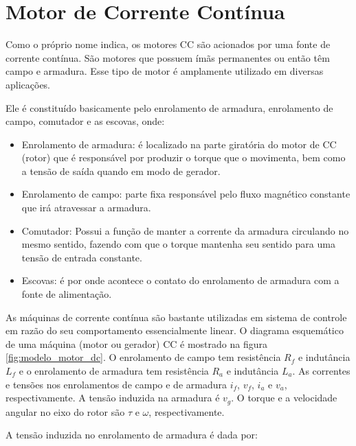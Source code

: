 \section{Motor de Corrente Contínua}
\label{sec:motor_ref_teo}
Como o próprio nome indica, os motores CC são acionados por uma fonte de corrente contínua. São motores que possuem ímãs permanentes ou então têm campo e armadura. Esse tipo de motor é amplamente utilizado em diversas aplicações.

Ele é constituído basicamente pelo enrolamento de armadura, enrolamento de campo, comutador e as escovas, onde:

\begin{itemize}
    \item Enrolamento de armadura: é localizado na parte giratória do motor de CC (rotor) que é responsável por produzir o torque que o movimenta, bem como a tensão de saída quando em modo de gerador.
    
    \item Enrolamento de campo: parte fixa responsável pelo fluxo magnético constante que irá atravessar a armadura. 
    
    \item Comutador: Possui a função de manter a corrente da armadura circulando no mesmo sentido, fazendo com que o torque mantenha seu sentido para uma tensão de entrada constante.
    
    \item Escovas: é por onde acontece o contato do enrolamento de armadura com a fonte de alimentação.
\end{itemize}


As máquinas de corrente contínua são bastante utilizadas em sistema de controle em razão do seu comportamento essencialmente linear. O diagrama esquemático de uma máquina (motor ou gerador) CC é mostrado na figura \ref{fig:modelo_motor_dc}. O enrolamento de campo tem resistência $R_f$ e indutância $L_f$ e o enrolamento de armadura tem resistência $R_a$ e indutância $L_a$. As correntes e tensões nos enrolamentos de campo e de armadura $i_f$, $v_f$, $i_a$ e $v_a$, respectivamente. A tensão induzida na armadura é $v_g$. O torque e a velocidade angular no eixo do rotor são $\tau$ e $\omega$, respectivamente.

A tensão induzida no enrolamento de armadura é dada por:

